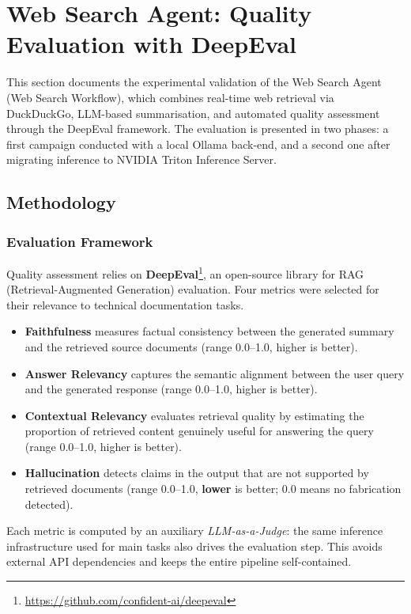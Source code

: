 \section{Web Search Agent: Quality Evaluation with DeepEval}

This section documents the experimental validation of the Web Search Agent (Web Search Workflow), which combines real-time web retrieval via DuckDuckGo, LLM-based summarisation, and automated quality assessment through the DeepEval framework. The evaluation is presented in two phases: a first campaign conducted with a local Ollama back-end, and a second one after migrating inference to NVIDIA Triton Inference Server.

\subsection{Methodology}

\subsubsection{Evaluation Framework}
Quality assessment relies on \textbf{DeepEval}\footnote{\url{https://github.com/confident-ai/deepeval}}, an open-source library for RAG (Retrieval-Augmented Generation) evaluation. Four metrics were selected for their relevance to technical documentation tasks.

\begin{itemize}
    \item \textbf{Faithfulness} measures factual consistency between the generated summary and the retrieved source documents (range 0.0--1.0, higher is better).
    \item \textbf{Answer Relevancy} captures the semantic alignment between the user query and the generated response (range 0.0--1.0, higher is better).
    \item \textbf{Contextual Relevancy} evaluates retrieval quality by estimating the proportion of retrieved content genuinely useful for answering the query (range 0.0--1.0, higher is better).
    \item \textbf{Hallucination} detects claims in the output that are not supported by retrieved documents (range 0.0--1.0, \textbf{lower} is better; 0.0 means no fabrication detected).
\end{itemize}

Each metric is computed by an auxiliary \emph{LLM-as-a-Judge}: the same inference infrastructure used for main tasks also drives the evaluation step. This avoids external API dependencies and keeps the entire pipeline self-contained.


